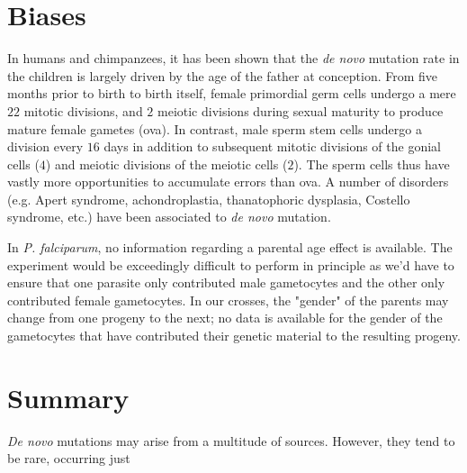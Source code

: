 \section{Biases}

In humans and chimpanzees, it has been shown that the \textit{de novo} mutation rate in the children is largely driven by the age of the father at conception\cite{Kong:2012ek,Venn:2014ep}.  From five months prior to birth to birth itself, female primordial germ cells undergo a mere $22$ mitotic divisions, and $2$ meiotic divisions during sexual maturity\cite{Crow:2000gn} to produce mature female gametes (ova).  In contrast, male sperm stem cells undergo a division every $16$ days in addition to subsequent mitotic divisions of the gonial cells ($4$) and meiotic divisions of the meiotic cells ($2$).  The sperm cells thus have vastly more opportunities to accumulate errors than ova.  A number of disorders (e.g. Apert syndrome, achondroplastia, thanatophoric dysplasia, Costello syndrome, etc.) have been associated to \textit{de novo} mutation\cite{Glaser:2003da,Goriely:2012fi,Veltman:2012gw}.

In \textit{P. falciparum}, no information regarding a parental age effect is available.  The experiment would be exceedingly difficult to perform in principle as we'd have to ensure that one parasite only contributed male gametocytes and the other only contributed female gametocytes.  In our crosses, the "gender" of the parents may change from one progeny to the next; no data is available for the gender of the gametocytes that have contributed their genetic material to the resulting progeny.

\section{Summary}

\textit{De novo} mutations may arise from a multitude of sources.  However, they tend to be rare, occurring just 
